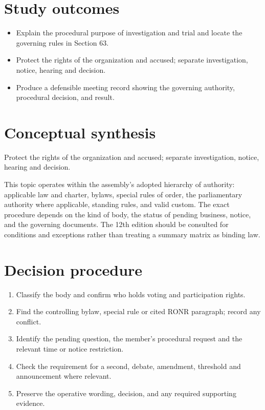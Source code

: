 \documentclass[11pt]{article}
\begin{document}
\SuiteOpen
{}
\section{Study outcomes}
\begin{itemize}[leftmargin=*,itemsep=4pt]
\item Explain the procedural purpose of investigation and trial and locate the governing rules in Section 63.
\item Protect the rights of the organization and accused; separate investigation, notice, hearing and decision.
\item Produce a defensible meeting record showing the governing authority, procedural decision, and result.
\end{itemize}

\section{Conceptual synthesis}
Protect the rights of the organization and accused; separate investigation, notice, hearing and decision.

This topic operates within the assembly’s adopted hierarchy of authority: applicable law and charter, bylaws, special rules of order, the parliamentary authority where applicable, standing rules, and valid custom. The exact procedure depends on the kind of body, the status of pending business, notice, and the governing documents. The 12th edition should be consulted for conditions and exceptions rather than treating a summary matrix as binding law.
\section{Decision procedure}
\begin{enumerate}[leftmargin=*,itemsep=4pt]
\item Classify the body and confirm who holds voting and participation rights.
\item Find the controlling bylaw, special rule or cited RONR paragraph; record any conflict.
\item Identify the pending question, the member’s procedural request and the relevant time or notice restriction.
\item Check the requirement for a second, debate, amendment, threshold and announcement where relevant.
\item Preserve the operative wording, decision, and any required supporting evidence.
\end{enumerate}
\end{document}
